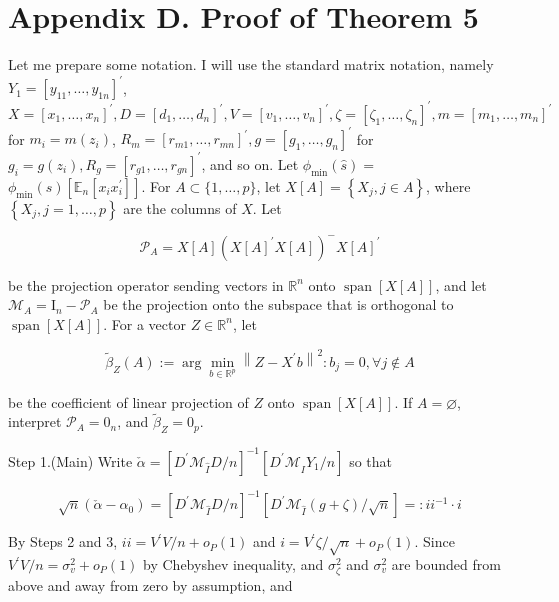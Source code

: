 \documentclass[10pt]{article}
\begin{document}
\section*{Appendix D. Proof of Theorem 5}
Let me prepare some notation. I will use the standard matrix notation, namely \(Y_{1}=\left[y_{11}, \ldots, y_{1 n}\right]^{\prime}\), \(X=\left[x_{1}, \ldots, x_{n}\right]^{\prime}, D=\left[d_{1}, \ldots, d_{n}\right]^{\prime}, V=\left[v_{1}, \ldots, v_{n}\right]^{\prime}, \zeta=\left[\zeta_{1}, \ldots, \zeta_{n}\right]^{\prime}, m=\left[m_{1}, \ldots, m_{n}\right]^{\prime}\) for \(m_{i}=m\left(z_{i}\right)\), \(R_{m}=\left[r_{m 1}, \ldots, r_{m n}\right]^{\prime}, g=\left[g_{1}, \ldots, g_{n}\right]^{\prime}\) for \(g_{i}=g\left(z_{i}\right), R_{g}=\left[r_{g 1}, \ldots, r_{g n}\right]^{\prime}\), and so on. Let \(\phi_{\min }(\widehat{s})=\) \(\phi_{\min }(\widehat{s})\left[\mathbb{E}_{n}\left[x_{i} x_{i}^{\prime}\right]\right]\). For \(A \subset\{1, \ldots, p\}\), let \(X[A]=\left\{X_{j}, j \in A\right\}\), where \(\left\{X_{j}, j=1, \ldots, p\right\}\) are the columns of \(X\). Let

\[
\mathcal{P}_{A}=X[A]\left(X[A]^{\prime} X[A]\right)^{-} X[A]^{\prime}
\]

be the projection operator sending vectors in \(\mathbb{R}^{n}\) onto \(\operatorname{span}[X[A]]\), and let \(\mathcal{M}_{A}=\mathrm{I}_{n}-\mathcal{P}_{A}\) be the projection onto the subspace that is orthogonal to \(\operatorname{span}[X[A]]\). For a vector \(Z \in \mathbb{R}^{n}\), let

\[
\tilde{\beta}_{Z}(A):=\arg \min _{b \in \mathbb{R}^{p}}\left\|Z-X^{\prime} b\right\|^{2}: b_{j}=0, \forall j \notin A
\]

be the coefficient of linear projection of \(Z\) onto \(\operatorname{span}[X[A]]\). If \(A=\varnothing\), interpret \(\mathcal{P}_{A}=0_{n}\), and \(\tilde{\beta}_{Z}=0_{p}\).

Step 1.(Main) Write \(\check{\alpha}=\left[D^{\prime} \mathcal{M}_{\widehat{I}} D / n\right]^{-1}\left[D^{\prime} \mathcal{M}_{\widehat{I}} Y_{1} / n\right]\) so that

\[
\sqrt{n}\left(\check{\alpha}-\alpha_{0}\right)=\left[D^{\prime} \mathcal{M}_{\widehat{I}} D / n\right]^{-1}\left[D^{\prime} \mathcal{M}_{\widehat{I}}(g+\zeta) / \sqrt{n}\right]=: i i^{-1} \cdot i
\]

By Steps 2 and 3, \(i i=V^{\prime} V / n+o_{P}(1)\) and \(i=V^{\prime} \zeta / \sqrt{n}+o_{P}(1)\). Since \(V^{\prime} V / n=\sigma_{v}^{2}+o_{P}(1)\) by Chebyshev inequality, and \(\sigma_{\zeta}^{2}\) and \(\sigma_{v}^{2}\) are bounded from above and away from zero by assumption, and
\end{document}
